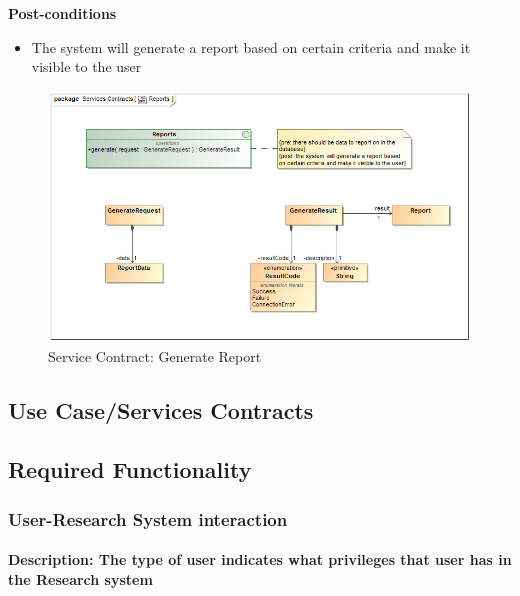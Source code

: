 \documentclass[a4paper]{article}
\begin{document}
	\textbf{Post-conditions}
	 \begin{itemize}
		\item The system will generate a report based on certain criteria and make it visible to the user
	\end{itemize}
		    	\begin{figure}[H]
		    		\centering
		    		\includegraphics[width=\textwidth]{5.1.17.Generate.Report.Services.Contract.png}
		    		\caption{Service Contract: Generate Report}
		    	\end{figure}
	
    \pagebreak
	\subsection{Use Case/Services Contracts}
	
	\subsection{Required Functionality}
	\subsubsection{User-Research System interaction}
	\paragraph{\textbf{Description:} The type of user indicates what privileges that user has in the Research system}
\end{document}
